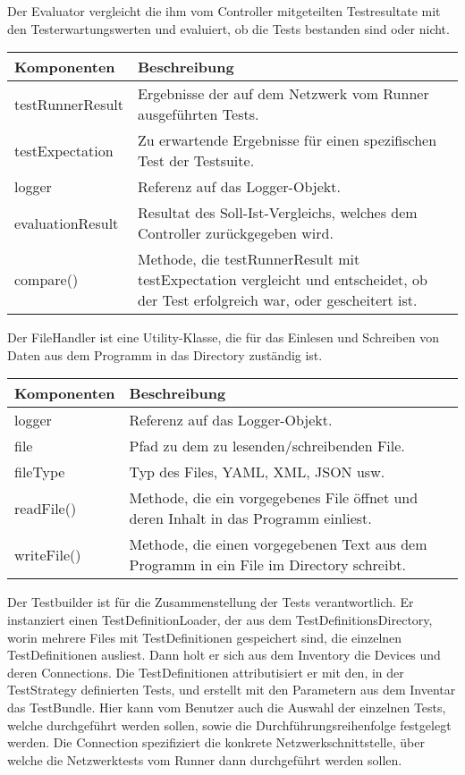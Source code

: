 \documentclass[]{subfiles}
\begin{document}
	Der Evaluator vergleicht die ihm vom Controller mitgeteilten Testresultate mit den Testerwartungswerten und evaluiert, ob die Tests bestanden sind oder nicht.

	\begin{tabularx}{\textwidth}{lX}
		\toprule
			Komponenten & Beschreibung \\
		\midrule
			testRunnerResult & Ergebnisse der auf dem Netzwerk vom Runner ausgeführten Tests. \\
			testExpectation & Zu erwartende Ergebnisse für einen spezifischen Test der Testsuite. \\
			logger & Referenz auf das Logger-Objekt. \\
			evaluationResult & Resultat des Soll-Ist-Vergleichs, welches dem Controller zurückgegeben wird.\\
		\midrule
			compare() & Methode, die testRunnerResult mit testExpectation vergleicht und entscheidet, ob der Test erfolgreich war, oder gescheitert ist. \\
		\bottomrule
	\end{tabularx}
	\newpage

	Der FileHandler ist eine Utility-Klasse, die für das Einlesen und Schreiben von Daten aus dem Programm in das Directory zuständig ist.
	
	\begin{tabularx}{\textwidth}{lX}
		\toprule
			Komponenten & Beschreibung \\
		\midrule
			logger & Referenz auf das Logger-Objekt. \\
			file & Pfad zu dem zu lesenden/schreibenden File. \\
			fileType & Typ des Files, YAML, XML, JSON usw. \\
		\midrule
			readFile() & Methode, die ein vorgegebenes File öffnet und deren Inhalt in das Programm einliest. \\
			writeFile() & Methode, die einen vorgegebenen Text aus dem Programm in ein File im Directory schreibt. \\
		\bottomrule
	\end{tabularx}

	Der Testbuilder ist für die Zusammenstellung der Tests verantwortlich. 
	Er instanziert einen TestDefinitionLoader, der aus dem TestDefinitionsDirectory, worin mehrere Files mit TestDefinitionen gespeichert sind, die einzelnen TestDefinitionen ausliest.
	Dann holt er sich aus dem Inventory die Devices und deren Connections. 
	Die TestDefinitionen attributisiert er mit den, in der TestStrategy definierten Tests, und erstellt mit den Parametern aus dem Inventar das TestBundle. 
	Hier kann vom Benutzer auch die Auswahl der einzelnen Tests, welche durchgeführt werden sollen, sowie die Durchführungsreihenfolge festgelegt werden.
	Die Connection spezifiziert die konkrete Netzwerkschnittstelle, über welche die Netzwerktests vom Runner dann durchgeführt werden sollen.
\end{document}
